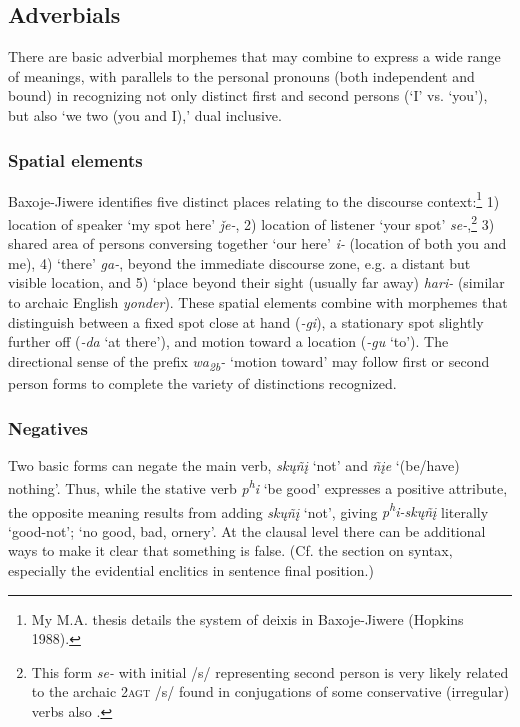 \documentclass[output=paper]{LSP/langsci}
\begin{document}
\subsection{Adverbials}
There are basic adverbial morphemes that may combine to express a wide range of meanings, with parallels to the personal pronouns (both independent and bound) in recognizing not only distinct first and second persons (`I' vs. `you'), but also `we two (you and I),' dual inclusive.  

\subsubsection{Spatial elements}   

Baxoje-Jiwere identifies five distinct places relating to the discourse context:\footnote{My M.A. thesis details the system of deixis in Baxoje-Jiwere (Hopkins 1988).} 1) location of speaker `my spot here' \textit{\v{j}e-},  2) location of  listener `your spot' \textit{se-},\footnote{This form \textit{se-} with initial /s/ representing second person is very likely related to the archaic \textsc{2agt} /s/ found in conjugations of some conservative (irregular) verbs also \citep[480]{Rankin2005}.}  3) shared area of persons conversing together `our here' \textit{i-} (location of both you and me),  4) `there' \textit{ga-}, beyond the immediate discourse zone, e.g. a distant but visible location, and 5) `place beyond their sight (usually far away) \textit{hari-} (similar to archaic English \textit{yonder}).  These spatial elements combine with morphemes that distinguish between a fixed spot close at hand (\textit{-gi}), a stationary spot slightly further off (\textit{-da} `at there'), and motion toward a location (\textit{-gu} `to').  The directional sense of the prefix \textit{wa\textsubscript{2b}-} `motion toward' may follow first or second person forms to complete the variety of distinctions recognized. 
	
\subsubsection{Negatives} 

 Two basic forms can negate the main verb, \textit{sk\k{u}\~n\k{i}} `not' and \textit{\~n\k{i}e} `(be/have) nothing'.  Thus, while the stative verb \textit{p\textsuperscript{h}i} `be good' expresses a positive attribute, the opposite meaning results from adding \textit{sk\k{u}\~n\k{i}} `not', giving \textit{p\textsuperscript{h}i-sk\k{u}\~n\k{i}}  literally `good-not'; `no good, bad, ornery'.  At the clausal level there can be additional ways to make it clear that something is false.  (Cf. the section on syntax, especially the evidential enclitics in sentence final position.)  
\end{document}
